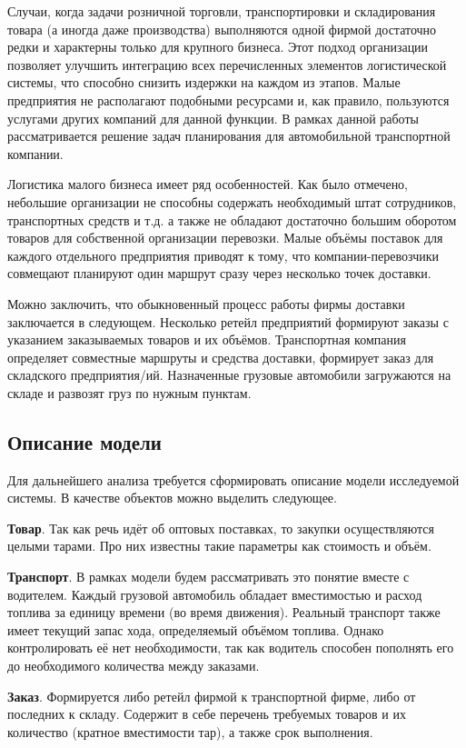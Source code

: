 	Случаи, когда задачи розничной торговли, транспортировки и складирования товара (а иногда даже производства) выполняются одной фирмой достаточно редки и характерны только для крупного бизнеса. Этот подход организации позволяет улучшить интеграцию всех перечисленных элементов логистической системы, что способно снизить издержки на каждом из этапов. Малые предприятия не располагают подобными ресурсами и, как правило, пользуются услугами других компаний для данной функции. В рамках данной работы рассматривается решение задач планирования для автомобильной транспортной компании.
	
	Логистика малого бизнеса имеет ряд особенностей\cite{subj:small_business}. Как было отмечено, небольшие организации не способны содержать необходимый штат сотрудников, транспортных средств и т.д. а также не обладают достаточно большим оборотом товаров для собственной организации перевозки. Малые объёмы поставок для каждого отдельного предприятия приводят к тому, что компании-перевозчики совмещают планируют один маршрут сразу через несколько точек доставки.
	
	Можно заключить, что обыкновенный процесс работы фирмы доставки заключается в следующем. Несколько ретейл предприятий формируют заказы с указанием заказываемых товаров и их объёмов. Транспортная компания определяет совместные маршруты и средства доставки, формирует заказ для складского предприятия/ий. Назначенные грузовые автомобили загружаются на складе и развозят груз по нужным пунктам.

\subsection{Описание модели}
	Для дальнейшего анализа требуется сформировать описание модели исследуемой системы. В качестве объектов можно выделить следующее.
	
	\textbf{Товар}. Так как речь идёт об оптовых поставках, то закупки осуществляются целыми тарами. Про них известны такие параметры как стоимость и объём.
	
	\textbf{Транспорт}. В рамках модели будем рассматривать это понятие вместе с водителем. Каждый грузовой автомобиль обладает вместимостью и расход топлива за единицу времени (во время движения). Реальный транспорт также имеет текущий запас хода, определяемый объёмом топлива. Однако контролировать её нет необходимости, так как водитель способен пополнять его до необходимого количества между заказами.
	
	\textbf{Заказ}. Формируется либо ретейл фирмой к транспортной фирме, либо от последних к складу. Содержит в себе перечень требуемых товаров и их количество (кратное вместимости тар), а также срок выполнения.
	
